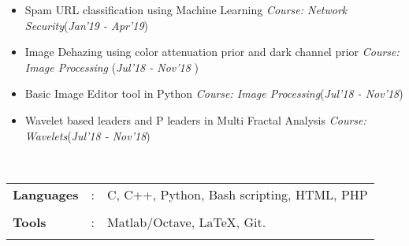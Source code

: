 \documentclass[10pt]{article}
\newcommand\hs{1.3mm}		%
\begin{document}
\colorbox{bl}{}
\vspace{-0.55cm}

\begin{itemize}[leftmargin=0.4cm]
\vspace{-0.05cm}
    	
	\item Spam URL classification using Machine Learning
 \textpipe \hspace{0.2cm} \textit{Course: Network Security}\hspace{2.7cm}(\textit{Jan'19 - Apr'19})\vspace{-0.25cm}
 
     \item Image Dehazing using color attenuation prior and dark channel prior \textpipe \hspace{-0.1cm} \textit{Course: Image Processing} \hfill{(\textit{Jul’18 - Nov’18 })}\vspace{-0.25cm}
	
	\item Basic Image Editor tool in Python
  \textpipe \hspace{0.2cm} \textit{Course: Image Processing}\hspace{5.1cm}(\textit{Jul'18 - Nov'18})\vspace{-0.25cm}
	\item Wavelet based leaders and P leaders in Multi Fractal Analysis \textpipe \hspace{0.2cm}  \textit{Course: Wavelets}\hspace{1.95cm}(\textit{Jul'18 - Nov'18})\vspace{-0.25cm}
	
\end{itemize}

\vspace{0.05cm}

\colorbox{bl}{}\\
\begin{tabular}{m{1in}m{0.20in}m{4.5in}}
	\\[-3mm]
	\hspace{\hs} \textbf{\textbf{Languages}} &: & {{C, C++, Python, Bash scripting, HTML, PHP}} \\
	\\[-3.5mm]
	\hspace{\hs} \textbf{\textbf{Tools}} &: & {Matlab/Octave, \LaTeX, Git.}\\
	\\[-4mm]
\end{tabular}\\
\end{document}
